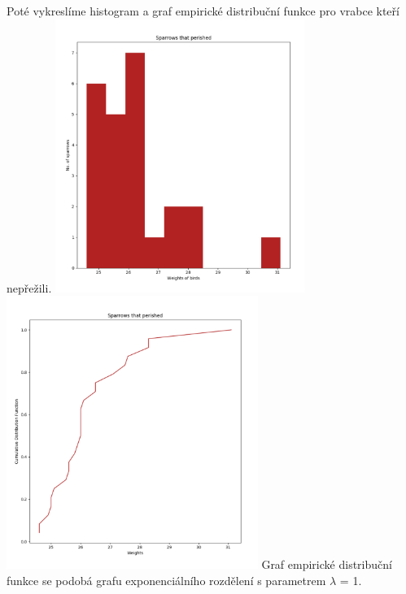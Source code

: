 \documentclass[12pt,a4paper]{article}
\begin{document}
Poté vykreslíme histogram a graf empirické distribuční funkce pro vrabce kteří nepřežili.
\includegraphics[height=3.5in]{diedHist}
\includegraphics[height=3.5in]{diedDist}
Graf empirické distribuční funkce se podobá grafu exponenciálního rozdělení s parametrem $\lambda$ = 1.\par \bigskip
\pagebreak
\end{document}
